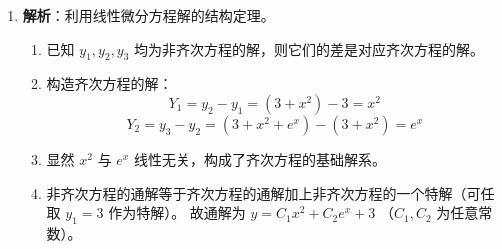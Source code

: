 \documentclass[lang=cn,11pt]{elegantbook}
\begin{document}
\begin{solution}
\begin{enumerate}
    \item[(5)] \textbf{解析}：利用线性微分方程解的结构定理。
    \begin{enumerate}
        \item 已知 $y_1, y_2, y_3$ 均为非齐次方程的解，则它们的差是对应齐次方程的解。
        \item 构造齐次方程的解：
        \[
        Y_1 = y_2 - y_1 = (3+x^2) - 3 = x^2
        \]
        \[
        Y_2 = y_3 - y_2 = (3+x^2+e^x) - (3+x^2) = e^x
        \]
        \item 显然 $x^2$ 与 $e^x$ 线性无关，构成了齐次方程的基础解系。
        \item 非齐次方程的通解等于齐次方程的通解加上非齐次方程的一个特解（可任取 $y_1=3$ 作为特解）。
        故通解为 \textbf{$y = C_1 x^2 + C_2 e^x + 3$} （$C_1, C_2$ 为任意常数）。
    \end{enumerate}
\end{enumerate}
\end{solution}
\end{document}
